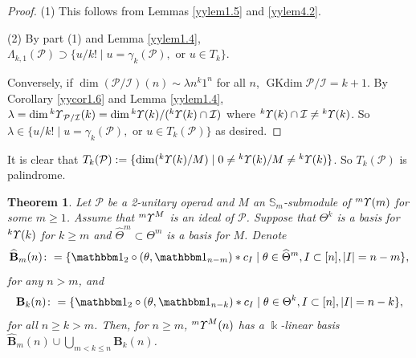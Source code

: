 \documentclass{amsart}
\newtheorem{thm}{Theorem}[section]
\theoremstyle{definition}
\theoremstyle{remark}
\numberwithin{equation}{section}
\def\S{\mathbb{S}}
\newcommand{\up}[1]{{^{#1}{\it \!\Upsilon}}}
\def \I{\mathcal{I}}
\def \ip{{\mathcal{P}}}
\def \dim{\operatorname{dim}}
\def\gkdim{\operatorname{GKdim}}
\def \1{\mathbbm 1}
\def \S{\mathbb{S}}
\begin{document}
\begin{proof} (1) This follows from 
Lemmas \ref{yylem1.5} and \ref{yylem4.2}.

(2) By part (1) and Lemma \ref{yylem1.4}, 
$\Lambda_{k,1}(\ip)\supset \{ u/k! \mid u=\gamma_k(\ip), {\text{ or }}
u\in T_k\}.$

Conversely, if $\dim (\ip/\I)(n)
\sim \lambda n^k 1^n$ for all $n$, $\gkdim \ip/\I=k+1$. 
By Corollary \ref{yycor1.6} and Lemma \ref{yylem1.4},
$\lambda =\dim \up{k}_{\ip/\I}(k)=\dim \up{k}(k)/(\up{k}(k)\cap \I)$
where $\up{k}(k)\cap \I\neq \up{k}(k)$. So $\lambda 
\in \{ u/k! \mid u=\gamma_k(\ip), {\text{ or }}
u\in T_k(\ip)\}$ as desired.
\end{proof}

It is clear that $T_k(\ip):=\{\dim (\up{k}(k)/M)
\mid 0\neq \up{k}(k)/M \neq \up{k}(k)\}$. So $T_{k}(\ip)$ 
is palindrome. 

\begin{thm}	
\label{yythm4.4}
Let $\ip$ be a 2-unitary operad and $M$ an $\S_m$-submodule 
of $\up{m}(m)$ for some $m\ge 1$. Assume that $\up{m}^M$ is 
an ideal of $\ip$. Suppose that $\Theta^k$ is a 
basis for $\up{k}(k)$ for $k\ge m$ and 
$\widehat{\Theta}^m\subset \Theta^m$ is a 
basis for $M$. Denote
\[\widehat{\textbf{B}}_m(n)\colon=\{\1_2\circ 
(\theta, \1_{n-m})\ast c_I\mid \theta\in \widehat{\Theta}^m, 
I\subset [n], |I|=n-m\},\]
for any $n>m$, and 
\[\textbf{B}_k(n)\colon=\{\1_2\circ (\theta, \1_{n-k})
\ast c_I\mid \theta\in \Theta^k, I\subset [n], |I|=n-k\},\]
for all $n\ge k> m$. Then, for $n\geq m$, $\up{m}^M(n)$ has 
a $\Bbbk$-linear basis $\widehat{\textbf{B}}_m(n)\cup 
\bigcup_{m<k\le n}\textbf{B}_k(n)$.
\end{thm}
\end{document}
